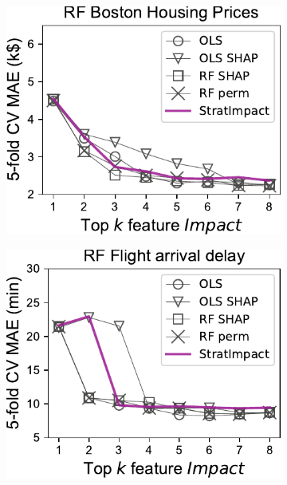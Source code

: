 \documentclass[11pt]{article}
\begin{document}
\begin{figure}
\centering
\begin{subfigure}{.245\textwidth}
    \centering
\includegraphics[scale=0.45]{images/boston-topk-RF-Impact.pdf}
\end{subfigure}%
\hfill
\begin{subfigure}{.245\textwidth}
    \centering
\includegraphics[scale=0.45]{images/flights-topk-RF-Impact.pdf}
\end{subfigure}
\hfill
\begin{subfigure}{.245\textwidth}

\end{subfigure}
\end{figure}
\end{document}
